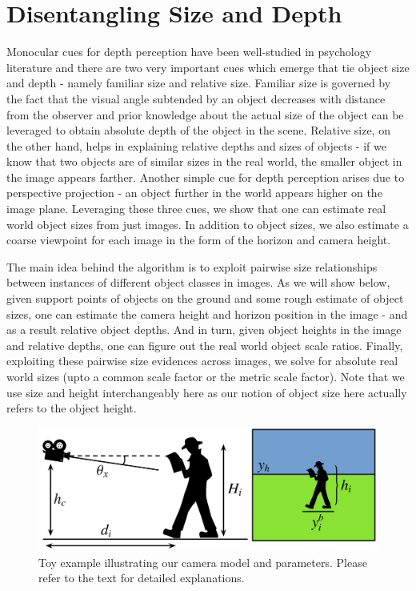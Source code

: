 \section{Disentangling Size and Depth}
Monocular cues for depth perception have been well-studied in psychology literature and there are two very important cues which emerge that tie object size and depth -  namely familiar size and relative size. Familiar size is governed by the fact that the visual angle subtended by an object decreases with distance from the observer and prior knowledge about the actual size of the object can be leveraged to obtain absolute depth of the object in the scene. Relative size, on the other hand, helps in explaining relative depths and sizes of objects - if we know that two objects are of similar sizes in the real world, the smaller object in the image appears farther. Another simple cue for depth perception arises due to perspective projection - an object further in the world appears higher on the image plane. Leveraging these three cues, we show that one can estimate real world object sizes from just images. In addition to object sizes, we also estimate a coarse viewpoint for each image in the form of the horizon and camera height. 

The main idea behind the algorithm is to exploit pairwise size relationships between instances of different object classes in images. As we will show below, given support points of objects on the ground and some rough estimate of object sizes, one can estimate the camera height and horizon position in the image - and as a result relative object depths. And in turn, given object heights in the image and relative depths, one can figure out the real world object scale ratios. Finally, exploiting these pairwise size evidences across images, we solve for absolute real world sizes (upto a common scale factor or the metric scale factor). Note that we use size and height interchangeably here as our notion of object size here actually refers to the object height.

\begin{figure}
  \centering
  \includegraphics[width=.9\textwidth]{figures/amodal/Perspective.png}
  \caption{ Toy example illustrating our camera model and parameters. Please refer to the text for detailed explanations. }
\end{figure}

